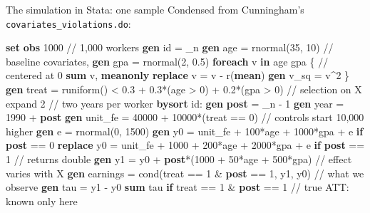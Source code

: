 \documentclass[
  11pt,
  ignorenonframetext,
  aspectratio=169,
]{beamer}
\newenvironment{Shaded}{\begin{snugshade}}{\end{snugshade}}
\newcommand{\CommentTok}[1]{\textcolor[rgb]{0.37,0.37,0.37}{#1}}
\newcommand{\DataTypeTok}[1]{\textcolor[rgb]{0.68,0.00,0.00}{#1}}
\newcommand{\FunctionTok}[1]{\textcolor[rgb]{0.28,0.35,0.67}{#1}}
\newcommand{\KeywordTok}[1]{\textcolor[rgb]{0.00,0.23,0.31}{\textbf{#1}}}
\newcommand{\NormalTok}[1]{\textcolor[rgb]{0.00,0.23,0.31}{#1}}
\newcommand{\OtherTok}[1]{\textcolor[rgb]{0.00,0.23,0.31}{#1}}
\begin{document}
\begin{frame}[fragile]{The simulation in Stata: one sample}
\protect{}\label{the-simulation-in-stata-one-sample}
Condensed from Cunningham's \texttt{covariates\_violations.do}:

\begin{Shaded}
\begin{Highlighting}[]
\KeywordTok{set} \KeywordTok{obs}\NormalTok{ 1000                                            }\CommentTok{// 1,000 workers}
\KeywordTok{gen}\NormalTok{ id  = }\DataTypeTok{\_n}
\KeywordTok{gen}\NormalTok{ age = rnormal(35, 10)                               }\CommentTok{// baseline covariates,}
\KeywordTok{gen}\NormalTok{ gpa = rnormal(2, 0.5)}
\KeywordTok{foreach}\NormalTok{ v }\KeywordTok{in}\NormalTok{ age gpa \{                                  }\CommentTok{// centered at 0}
    \KeywordTok{sum} \OtherTok{\textasciigrave{}v\textquotesingle{}}\NormalTok{, }\KeywordTok{meanonly}
    \KeywordTok{replace} \OtherTok{\textasciigrave{}v\textquotesingle{}}\NormalTok{ = }\OtherTok{\textasciigrave{}v\textquotesingle{}}\NormalTok{ {-} }\FunctionTok{r}\NormalTok{(}\KeywordTok{mean}\NormalTok{)}
    \KeywordTok{gen} \OtherTok{\textasciigrave{}v\textquotesingle{}}\NormalTok{\_sq = }\OtherTok{\textasciigrave{}v\textquotesingle{}}\NormalTok{\^{}2}
\NormalTok{\}}
\KeywordTok{gen}\NormalTok{ treat = runiform() \textless{} 0.3 + 0.3*(age \textgreater{} 0) + 0.2*(gpa \textgreater{} 0)     }\CommentTok{// selection on X}
\NormalTok{expand 2                                                }\CommentTok{// two years per worker}
\KeywordTok{bysort}\NormalTok{ id: }\KeywordTok{gen} \KeywordTok{post}\NormalTok{ = }\DataTypeTok{\_n}\NormalTok{ {-} 1}
\KeywordTok{gen} \FunctionTok{year}\NormalTok{ = 1990 + }\KeywordTok{post}
\KeywordTok{gen}\NormalTok{ unit\_fe = 40000 + 10000*(treat == 0)                }\CommentTok{// controls start 10,000 higher}
\KeywordTok{gen} \FunctionTok{e}\NormalTok{ = rnormal(0, 1500)}
\KeywordTok{gen}\NormalTok{     y0 = unit\_fe        + 100*age + 1000*gpa + }\FunctionTok{e} \KeywordTok{if} \KeywordTok{post}\NormalTok{ == 0}
\KeywordTok{replace}\NormalTok{ y0 = unit\_fe + 1000 + 200*age + 2000*gpa + }\FunctionTok{e} \KeywordTok{if} \KeywordTok{post}\NormalTok{ == 1    }\CommentTok{// returns double}
\KeywordTok{gen}\NormalTok{ y1 = y0 + }\KeywordTok{post}\NormalTok{*(1000 + 50*age + 500*gpa)            }\CommentTok{// effect varies with X}
\KeywordTok{gen}\NormalTok{ earnings = }\FunctionTok{cond}\NormalTok{(treat == 1 \& }\KeywordTok{post}\NormalTok{ == 1, y1, y0)     }\CommentTok{// what we observe}
\KeywordTok{gen}\NormalTok{ tau = y1 {-} y0}
\KeywordTok{sum}\NormalTok{ tau }\KeywordTok{if}\NormalTok{ treat == 1 \& }\KeywordTok{post}\NormalTok{ == 1                       }\CommentTok{// true ATT: known only here}
\end{Highlighting}
\end{Shaded}
\end{frame}
\end{document}
